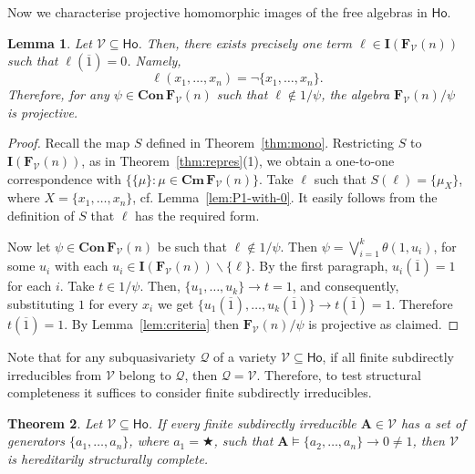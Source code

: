 \documentclass{amsart}
\newtheorem{theorem}{Theorem}[section]
\newtheorem{lemma}[theorem]{Lemma}
\newcommand{\alg}[1]{\mathbf{#1}}
\newcommand{\var}[1]{\mathsf{#1}}
\newcommand{\FV}{\alg{F}_\mathcal{V}}
\newcommand{\Con}[1]{\mathbf{Con}\, #1}
\newcommand{\Cm}[1]{\mathbf{Cm}\, #1}
\newcommand{\Irr}[1]{\mathbf{I}(#1)}
\def\ra{\rightarrow}
\def\op{\bigstar}
\begin{document}
Now we characterise projective homomorphic images of the free
algebras in $\mathsf{Ho}$. 

\begin{lemma}\label{lem:unique-term}
Let $\mathcal{V}\subseteq \var{Ho}$. Then, there exists precisely one term
$\ell\in\Irr{\FV(n)}$ such that $\ell(\overline{1})=0$. Namely,
$$
\ell(x_1,\dots,x_n) = \neg\{x_1,\dots, x_n\}.
$$
Therefore, for any
$\psi\in\Con{\FV(n)}$ such that $\ell\notin 1/\psi$, the algebra
$\FV(n)/\psi$ is projective.
\end{lemma}

\begin{proof}
Recall the map $S$ defined in Theorem~\ref{thm:mono}. Restricting $S$ to
$\Irr{\FV(n)}$, as in Theorem~\ref{thm:repres}(1), we obtain a one-to-one
correspondence with $\{\{\mu\}: \mu\in\Cm{\FV(n)}\}$.
Take $\ell$ such that $S(\ell) = \{\mu_X\}$, where $X = \{x_1,\dots,x_n\}$,
cf. Lemma~\ref{lem:P1-with-0}. It easily follows from the definition
of $S$ that $\ell$ has the required form. 

Now let $\psi\in\Con{\FV(n)}$ be such that $\ell\notin 1/\psi$.
Then 
$\psi = \bigvee_{i=1}^{k}\theta(1,u_i)$, for some $u_i$ with
each $u_i\in\Irr{\FV(n)}\smallsetminus\{\ell\}$. 
By the first paragraph, $u_i(\overline{1}) = 1$ for each $i$. Take
$t\in 1/\psi$. Then, $\{u_1,\dots, u_k\}\ra t = 1$, 
and consequently, substituting $1$ for every $x_i$ we get
$\bigl\{u_1(\overline{1}),\dots, u_k(\overline{1})\bigr\}\ra t(\overline{1}) = 1$.
Therefore $t(\overline{1}) = 1$. By  Lemma~\ref{lem:criteria} then
$\FV(n)/\psi$ is projective as claimed. 
\end{proof}


Note that for any subquasivariety $\mathcal{Q}$ of a variety
$\mathcal{V}\subseteq\var{Ho}$, if all finite subdirectly irreducibles from
$\mathcal{V}$ belong to $\mathcal{Q}$, then $\mathcal{Q} = \mathcal{V}$.
Therefore, to test structural completeness it suffices to consider finite
subdirectly irreducibles. 


\begin{theorem}\label{thm:generators}
Let $\mathcal{V}\subseteq\var{Ho}$. If every finite subdirectly irreducible
$\alg{A}\in\mathcal{V}$ has a set of generators $\{a_1,\dots, a_n\}$, where
$a_1 = \op$, such that
$\alg{A}\models \{a_2,\dots,a_n\}\ra 0 \neq 1$, then
$\mathcal{V}$ is hereditarily structurally complete.
\end{theorem}  
\end{document}
